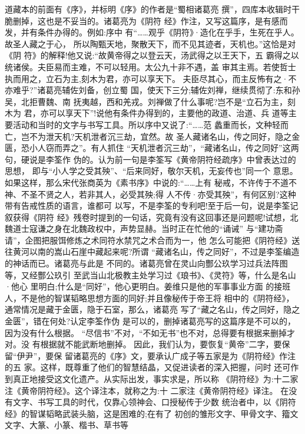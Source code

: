 \documentclass[12pt,UTF8]{ctexbook}
\begin{document}
道藏本的前面有《序》，并标明《序》的作者是“蜀相诸葛亮
撰”，四库本收辑时干脆删掉，这也是不妥当的。诸葛亮为《阴符
经》作注，又写这篇序，是有感而发，并有条件办得的。例如:序中
有“……观乎《阴符》·造化在乎手，生死在乎人。故圣人藏之于心，
所以陶甄天地，聚散天下，而不见其迹者，天机也。”这恰是对《阴
符》的解释!他又说:“故黄帝得之以登云天，汤武得之以王天下，五
霸得之以统诸侯。夫臣易而主难，不可以轻用。太公九十非不遇，盖
审其主焉。若使哲士执而用之，立石为主,刻木为君，亦可以享天下。
夫臣尽其心，而主反怖有之·不亦难乎?”诸葛亮辅佐刘备，创立蜀
国，使天下三分;辅佐刘禅，继续贯彻了:东和孙吴，北拒曹魏、南
抚夷越，西和羌戎。刘禅做了什么事呢?岂不是“立石为主，刻木为
君，亦可以享天下”!说他有条件办得到的，主要他的政道、治道、兵
道等主要活动和当时的文字与书写工具。所以序中又说了:“……范
蠡重而长，文种轻而亡，岂不为泄天机?天机泄者沉三劫，宜然。故
圣人藏诸名山，传之同好，隐之金匮，恐小人窃而弄之”。有人抓住
“天机泄者沉三劫”，“藏诸名山，传之同好”这两句，硬说是李筌作
伪的。认为前一句是李筌写《黄帝阴符经疏序》中曾表达过的思想，
即与“小人学之受其殃”、“后来同好，敬尔天机，无妄传也”同一个
意思。如果这样，那么宋代张商英为《素书序》中说的:“……上有
秘戒，不许传于不道不神、不圣不贤之人，若非其人，必受其殃;得
人不传·亦受其殃”，有何区别?这种带有告戒性质的语言，谁都可
以写，不是李筌的专利吧!至于后一句，说是李筌记叙获得《阴符
经》残卷时提到的一句话，究竟有没有这回事还是问题呢!试想，北
魏道士寇谦之身在北魏政权中，声势显赫。当时正在忙他的“诵诫”
与“建功斋请”，企图把服饵修炼之术同符水禁咒之术合而为一，他
怎么可能把《阴符经》送往黄河以南的嵩山石崖中藏起来呢?所谓
“藏诸名山，传之同好”，不过是李筌编造的神话而已。诸葛亮与此是
不同的。诸葛亮曾在灵山向酆公玖学习过兵法阵图等，又经酆公玖引
至武当山北极教主处学习过《琅书》、《灵符》等，什么是名山·他心
里明白;什么是“同好”，他心更明白。姜维只是他的军事事业方面
的接班人，不是他的智谋韬略思想方面的同好;并且像秘传于帝王将
相中的《阴符经》，通常情况是藏于金匮，隐于石室，那么，诸葛亮
写了“藏之名山，传之同好，隐之金匮”，错在何处?认定李筌作伪
是可以的，删掉诸葛亮写的这篇序是不可以的，因为没有什么根据。
“尽信书”不对，“不如无书”也不对，总得要有根据来删掉才对。没
有根据就不能武断地删掉。
因此，我们认为，要恢复“黄帝”二字，要保留“伊尹”，要保
留诸葛亮的《序》文，要承认广成子等五家是为《阴符经》作注的五
家。这样，既尊重了他们的智慧结晶，又促进读者的深入把握，问时
还可作到真正地接受这文化遗产。从实际出发，事实求是，所以称
《阴符经》为:十二家注《黄帝阴符经》。这个译注本，就称之为:十
二家注《黄帝阴符经》译注。
在没有文字、书写工具的时代，仅靠心领神会、口授秘传于少数
统治者中，以《阴符经》的智谋韬略武装头脑，这是困难的;在有了
初创的雏形文字、甲骨文字、籀文文字、大篆、小篆、楷书、草书等
\end{document}
